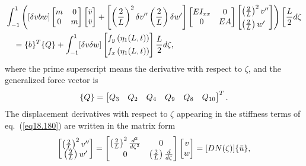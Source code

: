 \documentclass{AeroStructure-ERJohnson}
\begin{document}
\begin{align}\label{eq18.180}
&\int_{-1}^{1}\left([\delta v b w]
\left[\begin{array}{@{}cc@{}}m & 0 \\0 & m
\end{array}\right]
\left[\begin{array}{@{}c@{}}\ddot{v} \\\ddot{v}\end{array}\right]
+\left[\left(\frac{2}{L}\right)^{2} \delta v^{\prime \prime}\left(\frac{2}{L}\right) \delta w^{\prime}\right]
\left[\begin{array}{@{}cc@{}}E I_{x x} & 0 \\0 & E A\end{array}\right]
\left[\begin{array}{@{}l@{}}\left(\frac{2}{L}\right)^{2} v^{\prime \prime} \\[4pt] \left(\frac{2}{L}\right) w^{\prime}\end{array}\right]\right)\left[\frac{L}{2} d \zeta\right.\nonumber\\
&\quad=\{b\}^{T}\{Q\}+\int_{-1}^{1}[\delta v \delta w]\left[\begin{array}{@{}c@{}}f_{y}\left(\eta_{1}(L, t)\right) \\[4pt]
f_{x}\left(\eta_{1}(L, t)\right)\end{array}\right] \frac{L}{2} d \zeta,
\end{align}
where the prime superscript means the derivative with respect to $\zeta$, and the generalized force vector is
\begin{align}\label{eq18.181}
\{Q\}=\left[\begin{array}{@{}llllll@{}}Q_{3} & Q_{2} & Q_{4} & Q_{9} & Q_{8} & Q_{10}\end{array}\right]^{T}.
\end{align}
The displacement derivatives with respect to $\zeta$ appearing in the stiffness terms of eq.~(\ref{eq18.180}) are written in the matrix form
\begin{align}\label{eq18.182}
\left[\begin{array}{@{}c@{}}\left(\frac{2}{L}\right)^{2} v^{\prime \prime} \\\left(\frac{2}{L}\right) w^{\prime}\end{array}\right]=\left[\begin{array}{@{}cc@{}}\left(\frac{2}{L}\right)^{2} \frac{d^{2}}{d \zeta^{2}} & 0 \\0 & \left(\frac{2}{L}\right) \frac{d}{d \zeta}\end{array}\right]\left[\begin{array}{@{}c@{}}v \\w\end{array}\right]=[D N(\zeta)]\{\bar{u}\},
\end{align}
\end{document}
